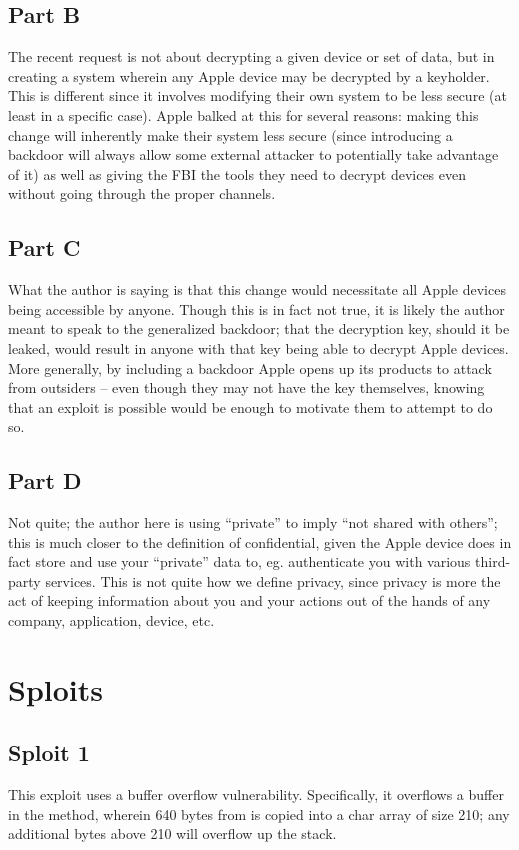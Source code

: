 \documentclass[12pt]{article}
\begin{document}
\subsection*{Part B}
The recent request is not about decrypting a given device or set of data, but in creating a system wherein any Apple device may be decrypted by a keyholder. This is different since it involves modifying their own system to be less secure (at least in a specific case). Apple balked at this for several reasons: making this change will inherently make their system less secure (since introducing a backdoor will always allow some external attacker to potentially take advantage of it) as well as giving the FBI the tools they need to decrypt devices even without going through the proper channels.

\subsection*{Part C}
What the author is saying is that this change would necessitate all Apple devices being accessible by anyone. Though this is in fact not true, it is likely the author meant to speak to the generalized backdoor; that the decryption key, should it be leaked, would result in anyone with that key being able to decrypt Apple devices. More generally, by including a backdoor Apple opens up its products to attack from outsiders -- even though they may not have the key themselves, knowing that an exploit is possible would be enough to motivate them to attempt to do so.

\subsection*{Part D}
Not quite; the author here is using ``private'' to imply ``not shared with others''; this is much closer to the definition of confidential, given the Apple device does in fact store and use your ``private'' data to, eg. authenticate you with various third-party services. This is not quite how we define privacy, since privacy is more the act of keeping information about you and your actions out of the hands of any company, application, device, etc.

\section*{Sploits}
\subsection*{Sploit 1}
This exploit uses a buffer overflow vulnerability. Specifically, it overflows a buffer in the  method, wherein 640 bytes from  is copied into a char array of size 210; any additional bytes above 210 will overflow up the stack.
\end{document}
